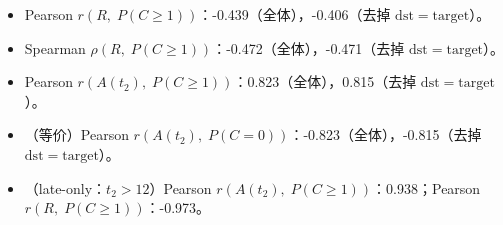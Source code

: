 \begin{itemize}
  \item Pearson $r(R,\;P(C\ge1))$：-0.439（全体），-0.406（去掉 $\mathrm{dst}=\mathrm{target}$）。
  \item Spearman $\rho(R,\;P(C\ge1))$：-0.472（全体），-0.471（去掉 $\mathrm{dst}=\mathrm{target}$）。
  \item Pearson $r(A(t_2),\;P(C\ge1))$：0.823（全体），0.815（去掉 $\mathrm{dst}=\mathrm{target}$）。
  \item （等价）Pearson $r(A(t_2),\;P(C=0))$：-0.823（全体），-0.815（去掉 $\mathrm{dst}=\mathrm{target}$）。
  \item （late-only：$t_2>12$）Pearson $r(A(t_2),\;P(C\ge1))$：0.938；Pearson $r(R,\;P(C\ge1))$：-0.973。
\end{itemize}
